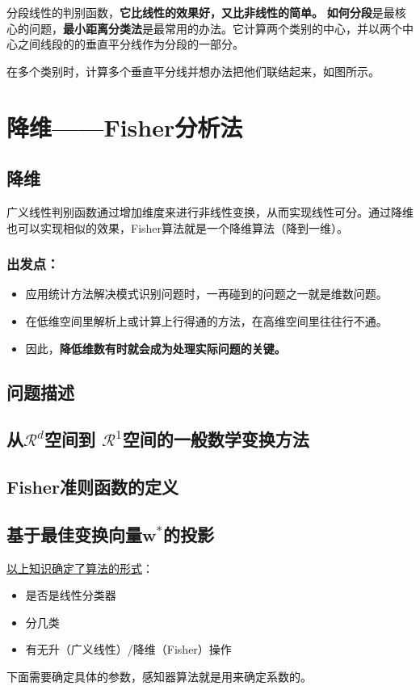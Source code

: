 \documentclass[12pt, letterpaper]{article}
\begin{document}
分段线性的判别函数，\textbf{它比线性的效果好，又比非线性的简单。}
\textbf{如何分段}是最核心的问题，\textbf{最小距离分类法}是最常用的办法。它计算两个类别的中心，并以两个中心之间线段的的垂直平分线作为分段的一部分。

在多个类别时，计算多个垂直平分线并想办法把他们联结起来，如图所示。


\section{降维——Fisher分析法}
\subsection{降维}
广义线性判别函数通过增加维度来进行非线性变换，从而实现线性可分。通过降维也可以实现相似的效果，Fisher算法就是一个降维算法（降到一维）。
\subsubsection*{出发点：}
\begin{itemize}
\item 应用统计方法解决模式识别问题时，一再碰到的问题之一就是维数问题。
\item 在低维空间里解析上或计算上行得通的方法，在高维空间里往往行不通。
\item 因此，\textbf{降低维数有时就会成为处理实际问题的关键。}
\end{itemize}

\subsection{问题描述}
\subsection{从\texorpdfstring{$\mathscr{R}^d$}{}空间到
\texorpdfstring{$\mathscr{R}^1$}{}空间的一般数学变换方法
}
\subsection{Fisher准则函数的定义}
\subsection{基于最佳变换向量\texorpdfstring{$\mathbf{w^*}$}{}的投影}
\underline{以上知识确定了算法的形式}：
\begin{itemize}
\item 是否是线性分类器
\item 分几类
\item 有无升（广义线性）/降维（Fisher）操作
\end{itemize}
下面需要确定具体的参数，感知器算法就是用来确定系数的。
\end{document}
